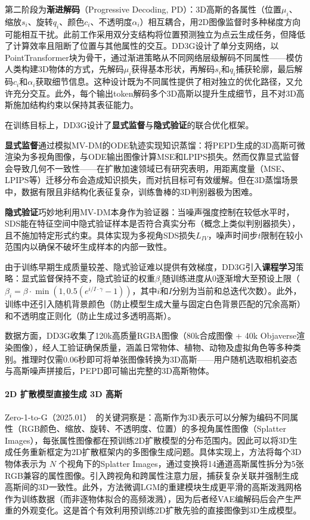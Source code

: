第二阶段为\textbf{渐进解码}（Progressive Decoding, PD）：3D高斯的各属性（位置$\mu_i$、缩放$s_i$、旋转$q_i$、颜色$c_i$、不透明度$\alpha_i$）相互耦合，用2D图像监督时多种梯度方向可能相互干扰。此前工作采用双分支结构将位置预测独立为点云生成任务，但降低了计算效率且阻断了位置与其他属性的交互。DD3G设计了单分支网络，以PointTransformer块为骨干，通过渐进策略从不同网络层级解码不同属性——模仿人类构建3D物体的方式，先解码$\mu_i$获得基本形状，再解码$s_i$和$q_i$捕获轮廓，最后解码$c_i$和$\alpha_i$获取细节信息。这种设计既为不同属性提供了相对独立的优化路径，又允许充分交互。此外，每个输出token解码多个3D高斯以提升生成细节，且不对3D高斯施加结构约束以保持其表征能力。

在训练目标上，DD3G设计了\textbf{显式监督}与\textbf{隐式验证}的联合优化框架。

\textbf{显式监督}通过模拟MV-DM的ODE轨迹实现知识蒸馏：将PEPD生成的3D高斯可微渲染为多视角图像，与ODE输出图像计算MSE和LPIPS损失。然而仅靠显式监督会导致几何不一致性——在扩散加速领域已有研究表明，用距离度量（MSE、LPIPS等）迁移分布会造成知识损失，而对抗目标可有效缓解。但在3D蒸馏场景中，数据有限且非结构化表征复杂，训练鲁棒的3D判别器极为困难。

\textbf{隐式验证}巧妙地利用MV-DM本身作为验证器：当噪声强度控制在较低水平时，SDS能在特征空间中隐式验证样本是否符合真实分布（概念上类似判别器损失），且不施加特定形式约束。具体实现为多视角SDS损失$L_{IV}$，噪声时间步$t$限制在较小范围内以确保不破坏生成样本的内部一致性。

由于训练早期生成质量较差、隐式验证难以提供有效梯度，DD3G引入\textbf{课程学习}策略：显式监督保持不变，隐式验证的权重$\beta_i$随训练进度从0逐渐增大至预设上限（$\beta_i = \beta \cdot \min(1, 0.5(e^{i/I \cdot \gamma} - 1))$，其中$i$和$I$分别为当前和总迭代次数）。此外，训练中还引入随机背景颜色（防止模型生成大量与固定白色背景匹配的冗余高斯）和不透明度正则化（防止生成过多透明高斯）。

数据方面，DD3G收集了120k高质量RGBA图像（80k合成图像 + 40k Objaverse渲染图像），经人工验证确保质量，涵盖日常物体、植物、动物及虚拟角色等多种类别。推理时仅需0.06秒即可将单张图像转换为3D高斯——用户随机选取相机姿态与高斯噪声拼接后，PEPD即可输出完整的3D高斯物体。

\paragraph{2D 扩散模型直接生成 3D 高斯}

Zero-1-to-G（2025.01）~\cite{2501_05427}的关键洞察是：高斯作为3D表示可以分解为编码不同属性（RGB颜色、缩放、旋转、不透明度、位置）的多视角属性图像（Splatter Images），每张属性图像都在预训练2D扩散模型的分布范围内。因此可以将3D生成任务重新框定为2D扩散框架内的多图像生成问题。具体实现上，方法将每个3D物体表示为 $N$ 个视角下的Splatter Images，通过变换将14通道高斯属性拆分为5张RGB兼容的属性图像。引入跨视角和跨属性注意力层，捕获复杂关联并强制生成高斯间的3D一致性。此外，方法微调LGM的重建模块生成更平滑的高斯泼溅网格作为训练数据（而非逐物体拟合的高频泼溅），因为后者经VAE编解码后会产生严重的外观变化。这是首个有效利用预训练2D扩散先验的直接图像到3D生成模型。

